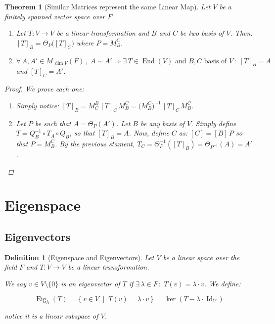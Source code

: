 \documentclass[12pt]{article}
\let\RA\Rightarrow
\newcommand{\set}[2]{\left\{{#1}\;\middle|\;{#2}\right\}}
\newcommand{\Forall}[1]{\forall\,{#1}\,,\;}
\newcommand{\Exist}[1]{\exists\,{#1}\,:\;}
\DeclareMathOperator{\Id}{Id}
\DeclareMathOperator{\Eig}{Eig}
\newtheorem{theorem}{Theorem}[subsection]
\newtheorem{definition}{Definition}[subsection]
\begin{document}
\pagebreak

\begin{theorem}[Similar Matrices represent the same Linear Map]
  Let $V$ be a finitely spanned vector space over $F$.
  \begin{enumerate}
    \item Let $T: V\to V$ be a linear transformation and $B$ and $C$ be two basis of $V$. Then: $[T]_B=\Theta_P\big([T]_C\big)$ where $P=M^C_B$.
    \item $\Forall{A,A'\in M_{\,\dim V}(F)}A\sim A'\RA \Exist{T\in\operatorname{End}(V)\text{ and }B,C\text{ basis of }V} [T]_B=A$ and $[T]_C=A'$.
  \end{enumerate}
  \begin{proof}
    We prove each one:
    \begin{enumerate}
      \item Simply notice: $[T]_B=M^B_C\,[T]_C\,M^C_B=\big(M^C_B\big)^{-1}\,[T]_C\,M^C_B$.
      \item Let $P$ be such that $A=\Theta_P(A')$. Let $B$ be any basis of $V$. Simply define $T=Q_B^{-1}\circ T_A\circ Q_B$, so that $[T]_B=A$. Now, define $C$ as: $[C]=[B]\,P$ so that $P=M^C_B$. By the previous stament, $T_C=\Theta^{-1}_P([T]_B)=\Theta_{P^{-1}}(A)=A'$.
    \end{enumerate}
  \end{proof}
\end{theorem}

\pagebreak

\section{Eigenspace}

\subsection{Eigenvectors}

\begin{definition}[Eigenspace and Eigenvectors]
  Let $V$ be a linear space over the field $F$ and $T: V\to V$ be a linear transformation.

  We say $v\in V\setminus\{0\}$ is an eigenvector of $T$ if $\Exist{\lambda\in F} T(v)=\lambda\cdot v$. We define:
  
  $$
  \Eig_{\lambda}(T)=\set{v\in V}{T(v)=\lambda\cdot v}=\ker(T-\lambda\cdot\Id_V)
  $$
  
  notice it is a linear subspace of $V$.
\end{definition}
\end{document}
